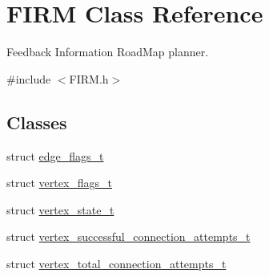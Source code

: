 \hypertarget{class_f_i_r_m}{\section{\-F\-I\-R\-M \-Class \-Reference}
\label{class_f_i_r_m}
}


\-Feedback \-Information \-Road\-Map planner.  




{\ttfamily \#include $<$\-F\-I\-R\-M.\-h$>$}

\subsection*{\-Classes}
\begin{DoxyCompactItemize}
\item 
struct \hyperlink{struct_f_i_r_m_1_1edge__flags__t}{edge\-\_\-flags\-\_\-t}
\item 
struct \hyperlink{struct_f_i_r_m_1_1vertex__flags__t}{vertex\-\_\-flags\-\_\-t}
\item 
struct \hyperlink{struct_f_i_r_m_1_1vertex__state__t}{vertex\-\_\-state\-\_\-t}
\item 
struct \hyperlink{struct_f_i_r_m_1_1vertex__successful__connection__attempts__t}{vertex\-\_\-successful\-\_\-connection\-\_\-attempts\-\_\-t}
\item 
struct \hyperlink{struct_f_i_r_m_1_1vertex__total__connection__attempts__t}{vertex\-\_\-total\-\_\-connection\-\_\-attempts\-\_\-t}
\end{DoxyCompactItemize}
